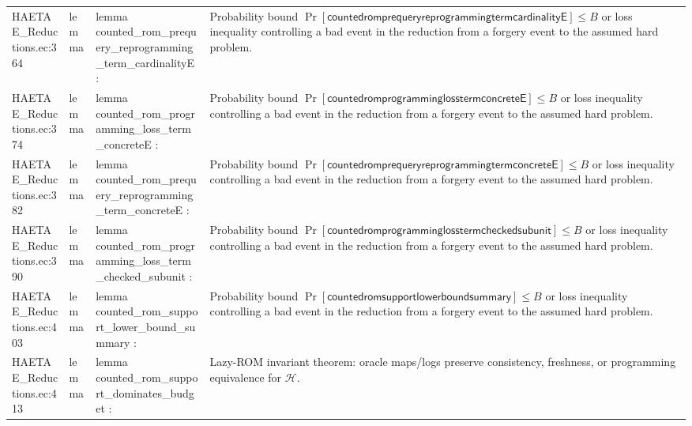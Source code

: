 \documentclass[10pt]{article}
\begin{document}
\begin{longtable}{L{0.11\textwidth}L{0.055\textwidth}L{0.385\textwidth}L{0.41\textwidth}}
HAETAE\_\allowbreak{}Reductions.\allowbreak{}ec:\allowbreak{}364 & lemma & {\ttfamily\scriptsize lemma counted\_\allowbreak{}rom\_\allowbreak{}prequery\_\allowbreak{}reprogramming\_\allowbreak{}term\_\allowbreak{}cardinalityE :} & Probability bound $\Pr[\mathsf{countedromprequeryreprogrammingtermcardinalityE}]\le B$ or loss inequality controlling a bad event in the reduction from a forgery event to the assumed hard problem. \\
HAETAE\_\allowbreak{}Reductions.\allowbreak{}ec:\allowbreak{}374 & lemma & {\ttfamily\scriptsize lemma counted\_\allowbreak{}rom\_\allowbreak{}programming\_\allowbreak{}loss\_\allowbreak{}term\_\allowbreak{}concreteE :} & Probability bound $\Pr[\mathsf{countedromprogramminglosstermconcreteE}]\le B$ or loss inequality controlling a bad event in the reduction from a forgery event to the assumed hard problem. \\
HAETAE\_\allowbreak{}Reductions.\allowbreak{}ec:\allowbreak{}382 & lemma & {\ttfamily\scriptsize lemma counted\_\allowbreak{}rom\_\allowbreak{}prequery\_\allowbreak{}reprogramming\_\allowbreak{}term\_\allowbreak{}concreteE :} & Probability bound $\Pr[\mathsf{countedromprequeryreprogrammingtermconcreteE}]\le B$ or loss inequality controlling a bad event in the reduction from a forgery event to the assumed hard problem. \\
HAETAE\_\allowbreak{}Reductions.\allowbreak{}ec:\allowbreak{}390 & lemma & {\ttfamily\scriptsize lemma counted\_\allowbreak{}rom\_\allowbreak{}programming\_\allowbreak{}loss\_\allowbreak{}term\_\allowbreak{}checked\_\allowbreak{}subunit :} & Probability bound $\Pr[\mathsf{countedromprogramminglosstermcheckedsubunit}]\le B$ or loss inequality controlling a bad event in the reduction from a forgery event to the assumed hard problem. \\
HAETAE\_\allowbreak{}Reductions.\allowbreak{}ec:\allowbreak{}403 & lemma & {\ttfamily\scriptsize lemma counted\_\allowbreak{}rom\_\allowbreak{}support\_\allowbreak{}lower\_\allowbreak{}bound\_\allowbreak{}summary :} & Probability bound $\Pr[\mathsf{countedromsupportlowerboundsummary}]\le B$ or loss inequality controlling a bad event in the reduction from a forgery event to the assumed hard problem. \\
HAETAE\_\allowbreak{}Reductions.\allowbreak{}ec:\allowbreak{}413 & lemma & {\ttfamily\scriptsize lemma counted\_\allowbreak{}rom\_\allowbreak{}support\_\allowbreak{}dominates\_\allowbreak{}budget :} & Lazy-ROM invariant theorem: oracle maps/logs preserve consistency, freshness, or programming equivalence for $\mathcal H$. \\

\end{longtable}
\end{document}
